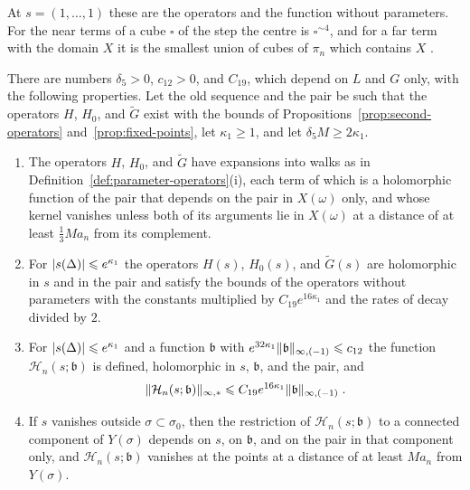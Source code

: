 \documentclass[11pt]{preprint}
\DeclarePairedDelimiter{\abs}{\lvert}{\rvert}
\DeclarePairedDelimiter{\norm}{\lVert}{\rVert}
\numberwithin{equation}{section}
\begin{document}
At $s = (1, \dots, 1)$ these are the operators and the function without parameters. For the near terms of a cube $\square$ of the step the centre is $\square^{\sim4}$, and for a far term with the domain $X$ it is the smallest union of cubes of $\pi_n$ which contains $X$ \cite[pp.~3, 8]{BalabanRG2}.

\begin{proposition}\label{prop:parameter-field}
There are numbers $\delta_5 > 0$, $c_{12} > 0$, and $C_{19}$, which depend on $L$ and $G$ only, with the following properties. Let the old sequence and the pair be such that the operators $H$, $H_0$, and $\tilde G$ exist with the bounds of Propositions~\ref{prop:second-operators} and~\ref{prop:fixed-points}, let $\kappa_1 \geqslant 1$, and let $\delta_5M \geqslant 2\kappa_1$.
\begin{enumerate}[label=(\roman*)]
\item The operators $H$, $H_0$, and $\tilde G$ have expansions into walks as in Definition~\ref{def:parameter-operators}(i), each term of which is a holomorphic function of the pair that depends on the pair in $X(\omega)$ only, and whose kernel vanishes unless both of its arguments lie in $X(\omega)$ at a distance of at least $\frac{1}{3}Ma_n$ from its complement.
\item For $\abs{s(\Delta)} \leqslant e^{\kappa_1}$ the operators $H(s)$, $H_0(s)$, and $\tilde G(s)$ are holomorphic in $s$ and in the pair and satisfy the bounds of the operators without parameters with the constants multiplied by $C_{19}e^{16\kappa_1}$ and the rates of decay divided by $2$.
\item For $\abs{s(\Delta)} \leqslant e^{\kappa_1}$ and a function $\mathfrak b$ with $e^{32\kappa_1}\norm{\mathfrak b}_{\infty,(-1)} \leqslant c_{12}$ the function $\mathcal H_n(s; \mathfrak b)$ is defined, holomorphic in $s$, $\mathfrak b$, and the pair, and
\begin{equation}\label{eq:parameter-field}
    \norm{\mathcal H_n(s; \mathfrak b)}_{\infty,*} \leqslant C_{19}e^{16\kappa_1}\norm{\mathfrak b}_{\infty,(-1)}\;.
\end{equation}
\item If $s$ vanishes outside $\sigma \subset \sigma_0$, then the restriction of $\mathcal H_n(s; \mathfrak b)$ to a connected component of $Y(\sigma)$ depends on $s$, on $\mathfrak b$, and on the pair in that component only, and $\mathcal H_n(s; \mathfrak b)$ vanishes at the points at a distance of at least $Ma_n$ from $Y(\sigma)$.
\end{enumerate}
\end{proposition}
\end{document}
